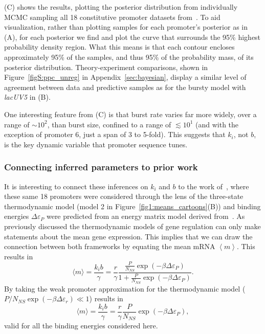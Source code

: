 (C) shows the results, plotting the posterior
distribution from individually MCMC sampling all 18 constitutive promoter
datasets from~\cite{Jones2014}. To aid visualization, rather than plotting
samples for each promoter's posterior as in (A), for
each posterior we find and plot the curve that surrounds the 95\% highest
probability density region. What this means is that each contour 
encloses approximately 95\% of the samples, and thus 95\% of the probability
mass, of its posterior distribution. Theory-experiment comparisons,
shown in Figure~\ref{figS:ppc_unreg} in Appendix~\ref{sec:bayesian},
display a similar level of agreement between data and predictive samples as for
the bursty model with \textit{lacUV5} in (B).

One interesting feature from (C) is that burst rate
varies far more widely, over a range of $\sim10^2$, than burst size, confined to
a range of $\lesssim10^1$ (and with the exception of promoter 6, just a span of
3 to 5-fold). This suggests that $k_i$, not $b$, is the key dynamic variable that
promoter sequence tunes.

\subsubsection{Connecting inferred parameters to prior work}
It is interesting to connect these inferences on $k_i$ and $b$ to the work
of~\cite{Brewster2012}, where these same 18 promoters were considered through
the lens of the three-state thermodynamic model (model 2 in
Figure~\ref{fig1:means_cartoons}(B)) and binding energies $\Delta\varepsilon_P$
were predicted from an energy matrix model derived from~\cite{Kinney2010}. As
previously discussed the thermodynamic models of gene regulation can only make
statements about the mean gene expression. This implies that we can draw the
connection between both frameworks by equating the mean mRNA $\left\langle m
\right\rangle$. This results in
\begin{equation}
\langle m \rangle = \frac{k_i b}{\gamma}
        = \frac{r}{\gamma}
        \frac{\frac{P}{N_{NS}}\exp(-\beta\Delta\varepsilon_P)}
                {1+\frac{P}{N_{NS}}\exp(-\beta\Delta\varepsilon_P)}.
\end{equation}
By taking the weak promoter approximation for the thermodynamic model ($P/N_{NS}
\exp(-\beta\Delta\varepsilon_r) \ll 1$) results in~\cite{Brewster2012}
\begin{equation}
\langle m \rangle = \frac{k_i b}{\gamma}
        = \frac{r}{\gamma} \frac{P}{N_{NS}}\exp(-\beta\Delta\varepsilon_P),
\end{equation}
valid for all the binding energies considered here.

